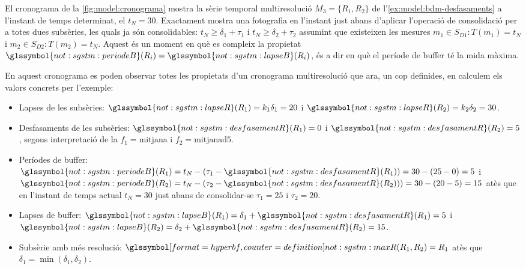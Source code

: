 \begin{example}
  \label{ex:sgstm:abanscons}
  El cronograma de la \autoref{fig:model:cronograma} mostra la sèrie
  temporal multiresolució $M_3=\{R_1,R_2\}$ de
  l'\autoref{ex:model:bdm-desfasaments} a l'instant de temps
  determinat, el $t_N=30$. Exactament mostra una fotografia en
  l'instant just abans d'aplicar l'operació de consolidació per a
  totes dues subsèries, les quals ja són consolidables:
  $t_N\geq\delta_1+\tau_1$ i $t_N\geq\delta_2+\tau_2$ assumint que
  existeixen les mesures $m_1\in S_{D1}: T(m_1)=t_N$ i $m_2\in S_{D2}:
  T(m_2)=t_N$.  Aquest és un moment en què es compleix la propietat
  $\glssymbol{not:sgstm:periodeB}(R_i)=\glssymbol{not:sgstm:lapseB}(R_i)$,
  és a dir en què el període de buffer té la mida màxima.

  En aquest cronograma es poden observar totes les propietats d'un
  cronograma multiresolució que ara, un cop definides, en calculem els
  valors concrets per l'exemple:
  \begin{itemize}
  \item Lapses de les subsèries:
    $\glssymbol{not:sgstm:lapseR}(R_1)=k_1\delta_1=20$ i
    $\glssymbol{not:sgstm:lapseR}(R_2)=k_2\delta_2=30$.
  \item Desfasaments de les subsèries:
    $\glssymbol{not:sgstm:desfasamentR}(R_1)=0$ i
    $\glssymbol{not:sgstm:desfasamentR}(R_2)=5$, segons interpretació
    de la $f_1=\text{mitjana}$ i $f_2=\text{mitjanad5}$.
  \item Períodes de buffer: $\glssymbol{not:sgstm:periodeB}(R_1)
    =t_N-(\tau_1-\glssymbol{not:sgstm:desfasamentR}(R_1))
    =30-(25-0)=5$ i $\glssymbol{not:sgstm:periodeB}(R_2)
    =t_N-(\tau_2-\glssymbol{not:sgstm:desfasamentR}(R_2)))
    =30-(20-5)=15$ atès que en l'instant de temps actual $t_N=30$ just
    abans de consolidar-se $\tau_1=25$ i $\tau_2=20$.
  \item Lapses de buffer: $\glssymbol{not:sgstm:lapseB}(R_1)=
    \delta_1+\glssymbol{not:sgstm:desfasamentR}(R_1)=5$ i
    $\glssymbol{not:sgstm:lapseB}(R_2)=
    \delta_2+\glssymbol{not:sgstm:desfasamentR}(R_2)=15$.
  \item Subsèrie amb més resolució:
    $\glssymboldef{not:sgstm:maxR}(R_1,R_2)=R_1$ atès que
    $\delta_1=\min(\delta_1,\delta_2)$.
  \end{itemize}




\end{example}



